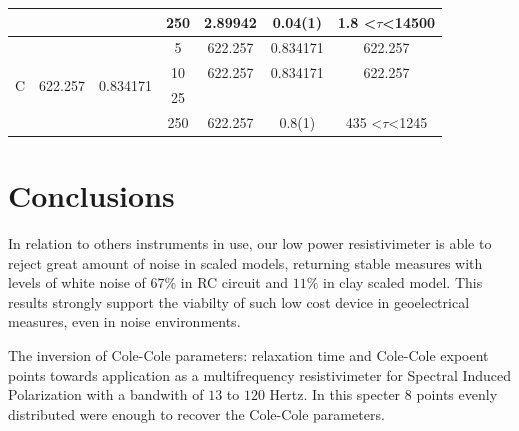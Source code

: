 \documentclass{vie16}
\begin{document}
\begin{table}[h!]
\begin{tabular}{@{}|c|c|c|c|c|c|c|@{}}
                   &                          &                            & 250                                                                            & 2.89942         & 0.04(1)           & 1.8 \textless$\tau$\textless 14500  \\ \hline
\multirow{4}{*}{C} & \multirow{4}{*}{622.257} & \multirow{4}{*}{0.834171}  & 5                                                                              & 622.257         & 0.834171          & 622.257                             \\
                   &                          &                            & 10                                                                             & 622.257         & 0.834171          & 622.257                             \\
                   &                          &                            & 25                                                                             &                 &                   &                                     \\
                   &                          &                            & 250                                                                            & 622.257         & 0.8(1)            & 435 \textless $\tau $\textless 1245
\end{tabular}
\end{table}



\section{Conclusions}

In relation to others instruments in use, our low power resistivimeter is able to reject great amount of noise in scaled models, returning stable measures with levels of white noise of $67 \%$ in RC circuit and $11 \%$ in clay scaled model. This results strongly support the viabilty of such low cost device in geoelectrical measures, even in noise environments.

The inversion of Cole-Cole parameters: relaxation time and Cole-Cole expoent points towards application as a multifrequency resistivimeter for Spectral Induced Polarization with a bandwith of $13$ to $120$ Hertz. In this specter $8$ points evenly distributed were enough to recover the Cole-Cole parameters.



		
\end{document}
